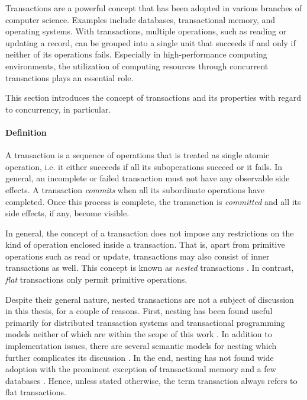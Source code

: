 Transactions are a powerful concept that has been adopted in various branches of
computer science. Examples include databases, transactional memory, and
operating systems. With transactions, multiple operations, such as reading or
updating a record, can be grouped into a single unit that succeeds if and only
if neither of its operations fails. Especially in high-performance computing
environments, the utilization of computing resources through concurrent
transactions plays an essential role.

This section introduces the concept of transactions and its properties with
regard to concurrency, in particular.

\paragraph{Definition}

A transaction is a sequence of operations that is treated as single atomic
operation, i.e. it either succeeds if all its suboperations succeed or it fails.
In general, an incomplete or failed transaction must not have any observable
side effects. A transaction \emph{commits} when all its subordinate operations
have completed. Once this process is complete, the transaction is
\emph{committed} and all its side effects, if any, become visible.

In general, the concept of a transaction does not impose any restrictions on the
kind of operation enclosed inside a transaction. That is, apart from primitive
operations such as read or update, transactions may also consist of inner
transactions as well. This concept is known as \emph{nested} transactions
\cite{gray1981transaction}. In contrast, \emph{flat} transactions only permit
primitive operations.

Despite their general nature, nested transactions are not a subject of
discussion in this thesis, for a couple of reasons. First, nesting has been
found useful primarily for distributed transaction systems and transactional
programming models neither of which are within the scope of this work
\cite{moss2006open}. In addition to implementation issues, there are several
semantic models for nesting which further complicates its discussion
\cite{harder1993concurrency, weikum1992concepts}. In the end, nesting has not
found wide adoption with the prominent exception of transactional memory
\cite{moss2006nested, moravan2006supporting, saha2006mcrt,
jacobi2012transactional} and a few databases \cite{olson1999berkeley}. Hence,
unless stated otherwise, the term transaction always refers to flat
transactions.

